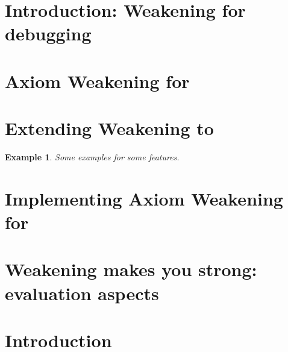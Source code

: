 \documentclass[
]{ceurart}
\newtheorem{example}{Example}
\begin{document}
\maketitle



\section{Introduction: Weakening for debugging}

\section{Axiom Weakening for \ALC}

\section{Extending Weakening to \SROIQ}
\begin{example}
    Some examples for some \SROIQ features.
\end{example}

\section{Implementing Axiom Weakening for \SROIQ}

\section{Weakening makes you strong: evaluation aspects}





\appendix

\section{Introduction}


    
\end{document}
